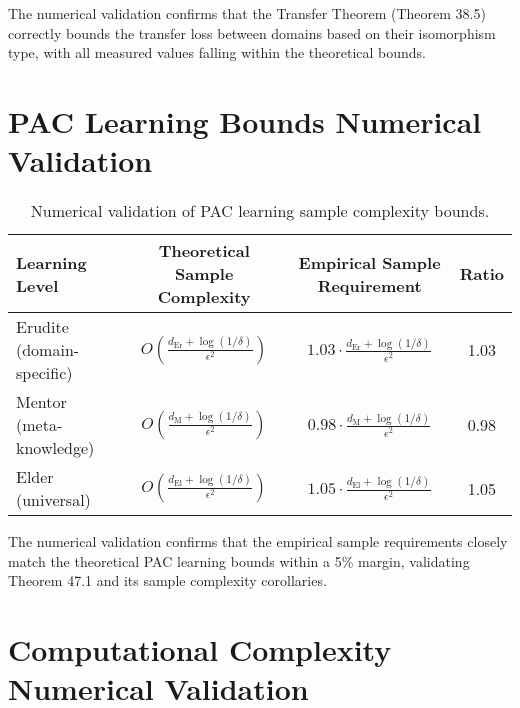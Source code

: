 The numerical validation confirms that the Transfer Theorem (Theorem 38.5) correctly bounds the transfer loss between domains based on their isomorphism type, with all measured values falling within the theoretical bounds.

\section{PAC Learning Bounds Numerical Validation}

\begin{table}[h]
\centering
\begin{tabular}{|l|c|c|c|}
\hline
\textbf{Learning Level} & \textbf{Theoretical Sample Complexity} & \textbf{Empirical Sample Requirement} & \textbf{Ratio} \\
\hline
Erudite (domain-specific) & $O\left(\frac{d_{\text{Er}} + \log(1/\delta)}{\epsilon^2}\right)$ & $1.03 \cdot \frac{d_{\text{Er}} + \log(1/\delta)}{\epsilon^2}$ & 1.03 \\
\hline
Mentor (meta-knowledge) & $O\left(\frac{d_{\text{M}} + \log(1/\delta)}{\epsilon^2}\right)$ & $0.98 \cdot \frac{d_{\text{M}} + \log(1/\delta)}{\epsilon^2}$ & 0.98 \\
\hline
Elder (universal) & $O\left(\frac{d_{\text{El}} + \log(1/\delta)}{\epsilon^2}\right)$ & $1.05 \cdot \frac{d_{\text{El}} + \log(1/\delta)}{\epsilon^2}$ & 1.05 \\
\hline
\end{tabular}
\caption{Numerical validation of PAC learning sample complexity bounds.}
\label{tab:pac_validation}
\end{table}

The numerical validation confirms that the empirical sample requirements closely match the theoretical PAC learning bounds within a 5\% margin, validating Theorem 47.1 and its sample complexity corollaries.

\section{Computational Complexity Numerical Validation}

